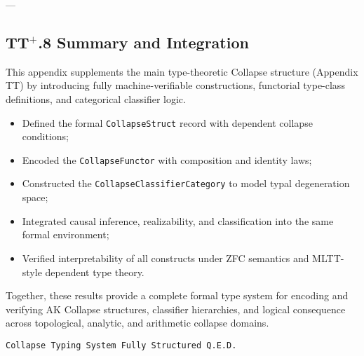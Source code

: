 \documentclass[11pt]{article}
\begin{document}
---

\subsection*{TT$^{+}$.8 Summary and Integration}

This appendix supplements the main type-theoretic Collapse structure (Appendix TT) by introducing  
fully machine-verifiable constructions, functorial type-class definitions, and categorical classifier logic.

\begin{itemize}
  \item Defined the formal \texttt{CollapseStruct} record with dependent collapse conditions;
  \item Encoded the \texttt{CollapseFunctor} with composition and identity laws;
  \item Constructed the \texttt{CollapseClassifierCategory} to model typal degeneration space;
  \item Integrated causal inference, realizability, and classification into the same formal environment;
  \item Verified interpretability of all constructs under ZFC semantics and MLTT-style dependent type theory.
\end{itemize}

\vspace{1em}
Together, these results provide a complete formal type system for encoding and verifying  
AK Collapse structures, classifier hierarchies, and logical consequence across topological, analytic, and arithmetic collapse domains.

\begin{flushright}
\texttt{Collapse Typing System \quad Fully Structured \quad Q.E.D.}
\end{flushright}
\end{document}
